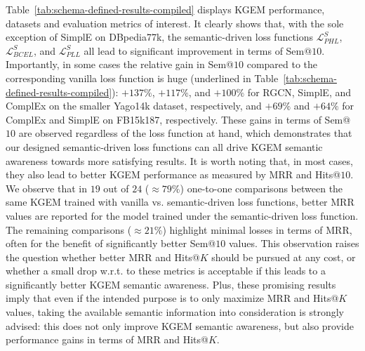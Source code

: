 \documentclass[letterpaper]{article} %
\begin{document}
Table~\ref{tab:schema-defined-results-compiled} displays KGEM performance, datasets and evaluation metrics of interest. It clearly shows that, with the sole exception of SimplE on DBpedia77k, the semantic-driven loss functions $\mathcal{L}^{S}_{PHL}$, $\mathcal{L}^{S}_{BCEL}$, and $\mathcal{L}^{S}_{PLL}$ all lead to significant improvement in terms of Sem@$10$. Importantly, in some cases the relative gain in Sem@$10$ compared to the corresponding vanilla loss function is huge (underlined in Table~\ref{tab:schema-defined-results-compiled}): $+137\%$, $+117\%$, and $+100\%$ for RGCN, SimplE, and ComplEx on the smaller Yago14k dataset, respectively, and $+69\%$ and $+64\%$ for ComplEx and SimplE on FB15k187, respectively. These gains in terms of Sem@$10$ are observed regardless of the loss function at hand, which demonstrates that our designed semantic-driven loss functions can all drive KGEM semantic awareness towards more satisfying results. It is worth noting that, in most cases, they also lead to better KGEM performance as measured by MRR and Hits@$10$. We observe that in $19$ out of $24$ ($\approx79\%$) one-to-one comparisons between the same KGEM trained with vanilla vs. semantic-driven loss functions, better MRR values are reported for the model trained under the semantic-driven loss function. The remaining comparisons ($\approx21\%$) highlight minimal losses in terms of MRR, often for the benefit of significantly better Sem@$10$ values. This observation raises the question whether better MRR and Hits@$K$ should be pursued at any cost, or whether a small drop w.r.t. to these metrics is acceptable if this leads to a significantly better KGEM semantic awareness. Plus, these promising results imply that even if the intended purpose is to only maximize MRR and Hits@$K$ values, taking the available semantic information into consideration is strongly advised: this does not only improve KGEM semantic awareness, but also provide performance gains in terms of MRR and Hits@$K$. 
\end{document}
